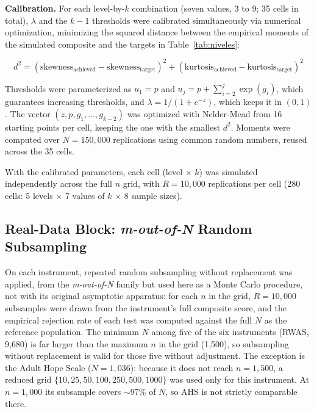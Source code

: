 \documentclass[man,mask,donotrepeattitle,floatsintext]{apa7}
\begin{document}
\textbf{Calibration.} For each level-by-$k$ combination (seven values, 3 to 9; 35 cells in total), $\lambda$ and the $k-1$ thresholds were calibrated simultaneously via numerical optimization, minimizing the squared distance between the empirical moments of the simulated composite and the targets in Table~\ref{tab:niveles}:

\begin{equation}
d^2 = (\text{skewness}_{\text{achieved}} - \text{skewness}_{\text{target}})^2 + (\text{kurtosis}_{\text{achieved}} - \text{kurtosis}_{\text{target}})^2
\end{equation}

Thresholds were parameterized as $u_1 = p$ and $u_j = p + \sum_{i=2}^{j} \exp(g_i)$, which guarantees increasing thresholds, and $\lambda = 1/(1+e^{-z})$, which keeps it in $(0,1)$. The vector $(z, p, g_1, \ldots, g_{k-2})$ was optimized with Nelder-Mead from 16 starting points per cell, keeping the one with the smallest $d^2$. Moments were computed over $N=150,000$ replications using common random numbers, reused across the 35 cells.

With the calibrated parameters, each cell (level $\times$ $k$) was simulated independently across the full $n$ grid, with $R=10,000$ replications per cell (280 cells: 5 levels $\times$ 7 values of $k$ $\times$ 8 sample sizes).

\subsection{Real-Data Block: \emph{m-out-of-N} Random Subsampling}
\label{sec:realdata}

On each instrument, repeated random subsampling without replacement was applied, from the \emph{m-out-of-N} family \parencite{politisromanowolf1999} but used here as a Monte Carlo procedure, not with its original asymptotic apparatus: for each $n$ in the grid, $R=10,000$ subsamples were drawn from the instrument's full composite score, and the empirical rejection rate of each test was computed against the full $N$ as the reference population. The minimum $N$ among five of the six instruments (RWAS, 9,680) is far larger than the maximum $n$ in the grid (1,500), so subsampling without replacement is valid for those five without adjustment. The exception is the Adult Hope Scale ($N=1,036$): because it does not reach $n=1,500$, a reduced grid $\{10, 25, 50, 100, 250, 500, 1000\}$ was used only for this instrument. At $n=1,000$ its subsample covers $\sim$97\% of $N$, so AHS is not strictly comparable there.
\end{document}
